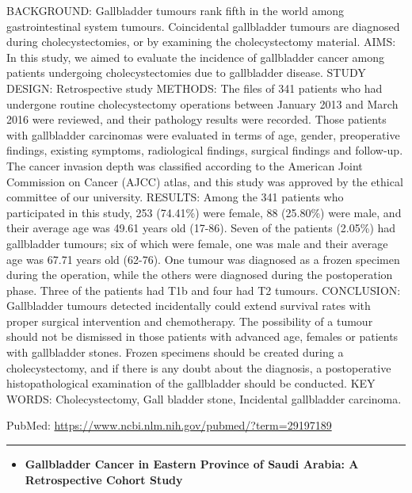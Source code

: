 \documentclass[]{article}
\providecommand{\tightlist}{%
  \setlength{\itemsep}{0pt}\setlength{\parskip}{0pt}}
\begin{document}
BACKGROUND: Gallbladder tumours rank fifth in the world among
gastrointestinal system tumours. Coincidental gallbladder tumours are
diagnosed during cholecystectomies, or by examining the cholecystectomy
material. AIMS: In this study, we aimed to evaluate the incidence of
gallbladder cancer among patients undergoing cholecystectomies due to
gallbladder disease. STUDY DESIGN: Retrospective study METHODS: The
files of 341 patients who had undergone routine cholecystectomy
operations between January 2013 and March 2016 were reviewed, and their
pathology results were recorded. Those patients with gallbladder
carcinomas were evaluated in terms of age, gender, preoperative
findings, existing symptoms, radiological findings, surgical findings
and follow-up. The cancer invasion depth was classified according to the
American Joint Commission on Cancer (AJCC) atlas, and this study was
approved by the ethical committee of our university. RESULTS: Among the
341 patients who participated in this study, 253 (74.41\%) were female,
88 (25.80\%) were male, and their average age was 49.61 years old
(17-86). Seven of the patients (2.05\%) had gallbladder tumours; six of
which were female, one was male and their average age was 67.71 years
old (62-76). One tumour was diagnosed as a frozen specimen during the
operation, while the others were diagnosed during the postoperation
phase. Three of the patients had T1b and four had T2 tumours.
CONCLUSION: Gallbladder tumours detected incidentally could extend
survival rates with proper surgical intervention and chemotherapy. The
possibility of a tumour should not be dismissed in those patients with
advanced age, females or patients with gallbladder stones. Frozen
specimens should be created during a cholecystectomy, and if there is
any doubt about the diagnosis, a postoperative histopathological
examination of the gallbladder should be conducted. KEY WORDS:
Cholecystectomy, Gall bladder stone, Incidental gallbladder carcinoma.

PubMed: \url{https://www.ncbi.nlm.nih.gov/pubmed/?term=29197189}

{}

{}

\begin{center}\rule{0.5\linewidth}{\linethickness}\end{center}

\begin{itemize}
\tightlist
\item
  \textbf{Gallbladder Cancer in Eastern Province of Saudi Arabia: A
  Retrospective Cohort Study}
\end{itemize}
\end{document}
